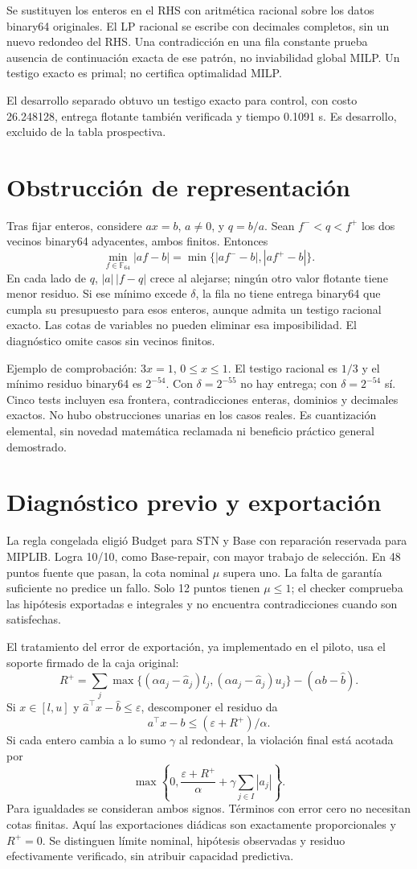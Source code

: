 \documentclass[10pt,a4paper]{article}
\begin{document}
Se sustituyen los enteros en el RHS con aritmética racional sobre los
datos binary64 originales. El LP racional se escribe con decimales completos,
sin un nuevo redondeo del RHS. Una contradicción en una fila constante
prueba ausencia de continuación exacta de ese patrón, no inviabilidad
global MILP. Un testigo exacto es primal; no certifica optimalidad MILP.

El desarrollo separado obtuvo un testigo exacto para control, con costo
26.248128, entrega flotante también verificada y tiempo
0.1091 s. Es desarrollo, excluido de la tabla prospectiva.

\section*{Obstrucción de representación}
Tras fijar enteros, considere $a x=b$, $a\ne0$, y $q=b/a$. Sean
$f^-<q<f^+$ los dos vecinos binary64 adyacentes, ambos finitos. Entonces
\[
\min_{f\in\mathbb F_{64}}|af-b|
=\min\{|af^--b|,|af^+-b|\}.
\]
En cada lado de $q$, $|a|\,|f-q|$ crece al alejarse; ningún otro valor
flotante tiene menor residuo. Si ese mínimo excede $\delta$, la fila no
tiene entrega binary64 que cumpla su presupuesto para esos enteros,
aunque admita un testigo racional exacto. Las cotas de variables no pueden
eliminar esa imposibilidad. El diagnóstico omite casos sin vecinos finitos.

Ejemplo de comprobación: $3x=1$, $0\le x\le1$. El testigo racional es
$1/3$ y el mínimo residuo binary64 es $2^{-54}$. Con $\delta=2^{-55}$
no hay entrega; con $\delta=2^{-54}$ sí. Cinco tests incluyen esa frontera,
contradicciones enteras, dominios y decimales exactos. No hubo obstrucciones
unarias en los casos reales. Es cuantización elemental, sin novedad
matemática reclamada ni beneficio práctico general demostrado.
\newpage
\section*{Diagnóstico previo y exportación}
La regla congelada eligió Budget para STN y Base con reparación reservada
para MIPLIB. Logra 10/10, como Base-repair, con mayor trabajo de selección.
En 48 puntos fuente que pasan, la cota nominal $\mu$ supera uno. La falta
de garantía suficiente no predice un fallo. Solo 12 puntos tienen
$\mu\le1$; el checker comprueba las hipótesis exportadas e integrales
y no encuentra contradicciones cuando son satisfechas.

El tratamiento del error de exportación, ya implementado en el piloto,
usa el soporte firmado de la caja original:
\[
R^+=\sum_j\max\{(\alpha a_j-\hat a_j)l_j,
(\alpha a_j-\hat a_j)u_j\}-(\alpha b-\hat b).
\]
Si $x\in[l,u]$ y $\hat a^\top x-\hat b\le\varepsilon$, descomponer
el residuo da
\[
a^\top x-b\le(\varepsilon+R^+)/\alpha.
\]
Si cada entero cambia a lo sumo $\gamma$ al redondear, la violación final
está acotada por
\[
\max\left\{0,\frac{\varepsilon+R^+}{\alpha}
+\gamma\sum_{j\in I}|a_j|\right\}.
\]
Para igualdades se consideran ambos signos. Términos con error cero no
necesitan cotas finitas. Aquí las exportaciones diádicas son exactamente
proporcionales y $R^+=0$. Se distinguen límite nominal, hipótesis observadas
y residuo efectivamente verificado, sin atribuir capacidad predictiva.
\end{document}

